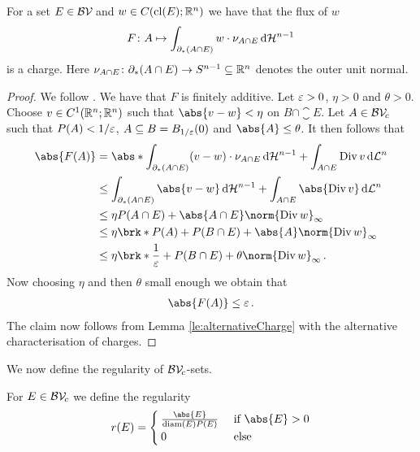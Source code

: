 \begin{claim}
For a set $E\in\mathcal{BV\!}$  and $w\in C(\operatorname{cl}(E);\mathbb{R}^n)$ we have that the flux of $w$
\begin{align*}
	F\colon A\mapsto \int_{\partial_*(A\cap E)}w\cdot\nu_{A\cap E}\,\mathrm{d} \mathcal{H}^{n-1}
\end{align*}
is a charge. Here $\nu_{A\cap E}\colon \partial_*(A\cap E)\to S^{n-1}\subseteq\mathbb{R}^n$ denotes the outer unit normal.
\end{claim}
\begin{proof}
We follow \cite[Example 2.1.4]{Pfe2001}.
We have that $F$ is finitely additive. Let $\varepsilon>0$, $\eta>0$ and $\theta>0$. Choose $v\in C^1(\mathbb{R}^n;\mathbb{R}^n)$ such that $\abs{v-w}<\eta$ on $B\cap\closure E$. Let $A\in\mathcal{BV\!}_c$ such that $P(A)<1/\varepsilon$, $A\subseteq B=B_{1/\varepsilon}(0)$ and $\abs{A}\leq \theta$. It then follows that
\begin{align*}
	\abs{F(A)}
	&= \abs*{\int_{\partial_*(A\cap E)}(v-w)\cdot\nu_{A\cap E}\dif\cH^{n-1}+\int_{A\cap E}\diver v\dif\cL^n} \\
	&\leq \int_{\partial_*(A\cap E)}\abs{v-w}\dif\cH^{n-1}+\int_{A\cap E}\abs{\diver v}\dif\cL^n \\
	&\leq \eta P(A\cap E)+\abs{A\cap E}\norm{\diver w}_\infty \\
	&\leq \eta \brk*{P(A)+P(B\cap E)}+\abs{A}\norm{\diver w}_\infty \\
	&\leq \eta\brk*{\frac{1}{\e}+P(B\cap E)}+\theta\norm{\diver w}_\infty\,.
\end{align*}
Now choosing $\eta$ and then $\theta$ small enough we obtain that
\begin{align*}
	\abs{F(A)}\leq \e\,.
\end{align*}
The claim now follows from Lemma \ref{le:alternativeCharge} with the alternative characterisation of charges.
\end{proof}

We now define the regularity of $\mathcal{BV\!}_c$-sets.

\begin{definition}
For $E\in \mathcal{BV\!}_c$ we define the regularity
\begin{align*}
	r(E)=\begin{cases}
		\frac{\abs{E}}{\diam(E)P(E)} &\text{ if }\abs{E}>0 \\
		0 &\text{ else}
	\end{cases}
\end{align*}
\end{definition}

